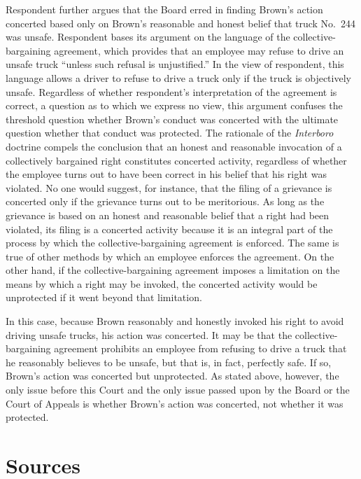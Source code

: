 \documentclass[
  letterpaper,
  11pt,
  DIV=9,
  openright]{scrbook}
\begin{document}
Respondent further argues that the Board erred in finding Brown's action
concerted based only on Brown's reasonable and honest belief that truck
No.~244 was unsafe. Respondent bases its argument on the language of the
collective-bargaining agreement, which provides that an employee may
refuse to drive an unsafe truck ``unless such refusal is unjustified.''
In the view of respondent, this language allows a driver to refuse to
drive a truck only if the truck is objectively unsafe. Regardless of
whether respondent's interpretation of the agreement is correct, a
question as to which we express no view, this argument confuses the
threshold question whether Brown's conduct was concerted with the
ultimate question whether that conduct was protected. The rationale of
the \emph{Interboro} doctrine compels the conclusion that an honest and
reasonable invocation of a collectively bargained right constitutes
concerted activity, regardless of whether the employee turns out to have
been correct in his belief that his right was violated. No one would
suggest, for instance, that the filing of a grievance is concerted only
if the grievance turns out to be meritorious. As long as the grievance
is based on an honest and reasonable belief that a right had been
violated, its filing is a concerted activity because it is an integral
part of the process by which the collective-bargaining agreement is
enforced. The same is true of other methods by which an employee
enforces the agreement. On the other hand, if the collective-bargaining
agreement imposes a limitation on the means by which a right may be
invoked, the concerted activity would be unprotected if it went beyond
that limitation.

In this case, because Brown reasonably and honestly invoked his right to
avoid driving unsafe trucks, his action was concerted. It may be that
the collective-bargaining agreement prohibits an employee from refusing
to drive a truck that he reasonably believes to be unsafe, but that is,
in fact, perfectly safe. If so, Brown's action was concerted but
unprotected. As stated above, however, the only issue before this Court
and the only issue passed upon by the Board or the Court of Appeals is
whether Brown's action was concerted, not whether it was protected.


\backmatter

\pagestyle{plain.scrheadings}

\chapter*{Sources}
\end{document}
